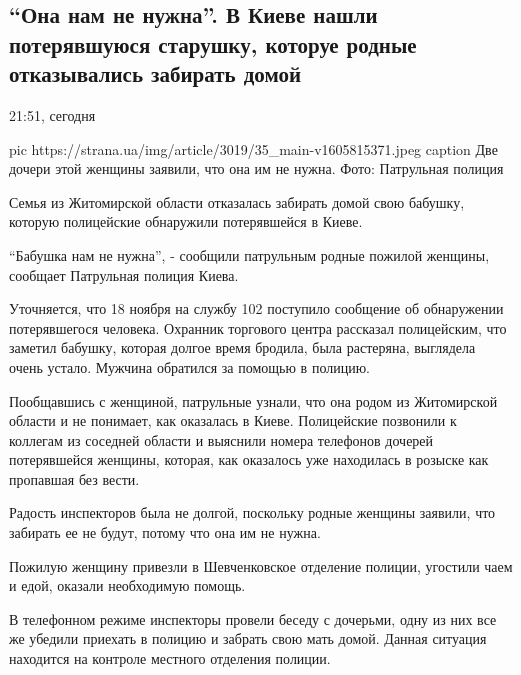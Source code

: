  
 
 

\subsection{\enquote{Она нам не нужна}. В Киеве нашли потерявшуюся старушку, которуе родные отказывались забирать домой}

21:51, сегодня

\ifcmt
pic https://strana.ua/img/article/3019/35_main-v1605815371.jpeg
caption Две дочери этой женщины заявили, что она им не нужна. Фото: Патрульная полиция
\fi

Семья из Житомирской области отказалась забирать домой свою бабушку,
которую полицейские обнаружили потерявшейся в Киеве.

\enquote{Бабушка нам не нужна}, - сообщили патрульным родные пожилой женщины,
сообщает Патрульная полиция Киева.

Уточняется, что 18 ноября на службу 102 поступило сообщение об обнаружении
потерявшегося человека. Охранник торгового центра рассказал полицейским,
что заметил бабушку, которая долгое время бродила, была растеряна,
выглядела очень устало. Мужчина обратился за помощью в полицию.

Пообщавшись с женщиной, патрульные узнали, что она родом из Житомирской области
и не понимает, как оказалась в Киеве. Полицейские позвонили к коллегам из
соседней области и выяснили номера телефонов дочерей потерявшейся женщины,
которая, как оказалось уже находилась в розыске как пропавшая без вести.

Радость инспекторов была не долгой, поскольку родные женщины заявили, что
забирать ее не будут, потому что она им не нужна.

Пожилую женщину привезли в Шевченковское отделение полиции, угостили чаем и
едой, оказали необходимую помощь.

В телефонном режиме инспекторы провели беседу с дочерьми, одну из них все же
убедили приехать в полицию и забрать свою мать домой. Данная ситуация находится
на контроле местного отделения полиции.

